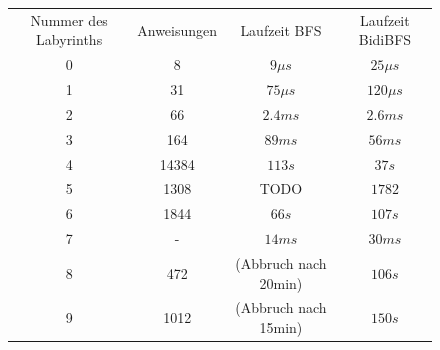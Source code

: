 \documentclass[a4paper,10pt,ngerman]{scrartcl}
\begin{document}
    \begin{figure}[H]
        \centering
        \begin{tabular}{||c | c | c | c||}
            Nummer des Labyrinths & Anweisungen & Laufzeit BFS         & Laufzeit BidiBFS \\
            0                     & 8           & $9 \mu s$            & $25 \mu s$       \\
            \hline
            1                     & 31          & $75 \mu s$           & $120 \mu s$      \\
            \hline
            2                     & 66          & $2.4 ms$             & $2.6 ms$         \\
            \hline
            3                     & 164         & $89 ms$              & $56 ms$          \\
            \hline
            4                     & 14384       & $113 s$              & $37 s$           \\
            \hline
            5                     & 1308        & TODO                 & $1782$           \\
            \hline
            6                     & 1844        & $66 s$               & $107 s$          \\
            \hline
            7                     & -           & $14ms$               & $30ms$           \\
            \hline
            8                     & 472         & (Abbruch nach 20min) & $106 s$          \\
            \hline
            9                     & 1012        & (Abbruch nach 15min) & $150 s$          \\
        \end{tabular}
    \end{figure}
\end{document}
